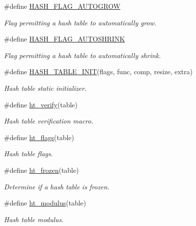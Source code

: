 \begin{CompactItemize}
\item 
\#define \hyperlink{group__dbprim__hash_a16}{HASH\_\-FLAG\_\-AUTOGROW}
\begin{CompactList}\small\item\em Flag permitting a hash table to automatically grow.\item\end{CompactList}\item 
\#define \hyperlink{group__dbprim__hash_a17}{HASH\_\-FLAG\_\-AUTOSHRINK}
\begin{CompactList}\small\item\em Flag permitting a hash table to automatically shrink.\item\end{CompactList}\item 
\#define \hyperlink{group__dbprim__hash_a18}{HASH\_\-TABLE\_\-INIT}(flags, func, comp, resize, extra)
\begin{CompactList}\small\item\em Hash table static initializer.\item\end{CompactList}\item 
\#define \hyperlink{group__dbprim__hash_a19}{ht\_\-verify}(table)
\begin{CompactList}\small\item\em Hash table verification macro.\item\end{CompactList}\item 
\#define \hyperlink{group__dbprim__hash_a20}{ht\_\-flags}(table)
\begin{CompactList}\small\item\em Hash table flags.\item\end{CompactList}\item 
\#define \hyperlink{group__dbprim__hash_a21}{ht\_\-frozen}(table)
\begin{CompactList}\small\item\em Determine if a hash table is frozen.\item\end{CompactList}\item 
\#define \hyperlink{group__dbprim__hash_a22}{ht\_\-modulus}(table)
\begin{CompactList}\small\item\em Hash table modulus.\item\end{CompactList}\item 

\end{CompactItemize}
